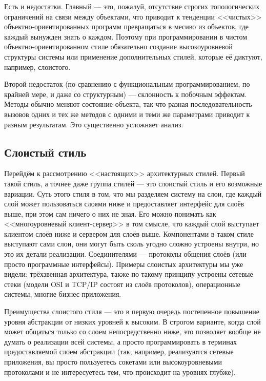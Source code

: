 \documentclass[a5paper]{article}
\begin{document}
Есть и недостатки. Главный --- это, пожалуй, отсутствие строгих топологических ограничений на связи между объектами, что приводит к тенденции <<чистых>> объектно-ориентированных программ превращаться в месиво из объектов, где каждый вынужден знать о каждом. Поэтому при программировании в чистом объектно-ориентированном стиле обязательно создание высокоуровневой структуры системы или применение дополнительных стилей, которые её диктуют, например, слоистого.

Второй недостаток (по сравнению с функциональным программированием, по крайней мере, и даже со структурным) --- склонность к побочным эффектам. Методы обычно меняют состояние объекта, так что разная последовательность вызовов одних и тех же методов с одними и теми же параметрами приводит к разным результатам. Это существенно усложняет анализ.

\subsection{Слоистый стиль}

Перейдём к рассмотрению <<настоящих>> архитектурных стилей. Первый такой стиль, а точнее даже группа стилей --- это слоистый стиль и его возможные вариации. Суть этого стиля в том, что мы разделяем систему на слои, где каждый слой может пользоваться слоями ниже и предоставляет интерфейс для слоёв выше, при этом сам ничего о них не зная. Его можно понимать как <<многоуровневый клиент-сервер>> в том смысле, что каждый слой выступает клиентом слоёв ниже и сервером для слоёв выше. Компонентами в таком стиле выступают сами слои, они могут быть сколь угодно сложно устроены внутри, но это их детали реализации. Соединителями --- протоколы общения слоёв (или просто программные интерфейсы). Примеры слоистых архитектуры мы уже видели: трёхзвенная архитектура, также по такому принципу устроены сетевые стеки (модели OSI и TCP/IP состоят из слоёв протоколов), операционные системы, многие бизнес-приложения.

Преимущества слоистого стиля --- это в первую очередь постепенное повышение уровня абстракции от низких уровней к высоким. В строгом варианте, когда слой может общаться только со слоем непосредственно ниже, это позволяет вообще не думать о  реализации всей системы, а просто программировать в терминах предоставляемой слоем абстракции (так, например, реализуются сетевые приложения, вы просто пользуетесь сокетами или высокоуровневыми протоколами и не интересуетесь тем, что происходит на уровнях глубже).
\end{document}
